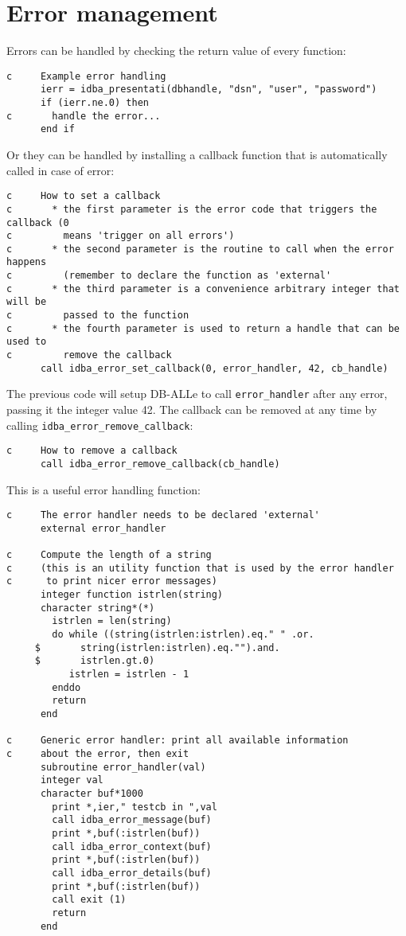\documentclass[draft,12pt,a4paper,twoside]{book}
\begin{document}
\section {Error management}

Errors can be handled by checking the return value of every function:

\begin{verbatim}
c     Example error handling
      ierr = idba_presentati(dbhandle, "dsn", "user", "password")
      if (ierr.ne.0) then
c       handle the error...
      end if
\end{verbatim}

Or they can be handled by installing a callback function that is automatically
called in case of error:

\begin{verbatim}
c     How to set a callback
c       * the first parameter is the error code that triggers the callback (0
c         means 'trigger on all errors')
c       * the second parameter is the routine to call when the error happens        
c         (remember to declare the function as 'external'
c       * the third parameter is a convenience arbitrary integer that will be
c         passed to the function
c       * the fourth parameter is used to return a handle that can be used to
c         remove the callback
      call idba_error_set_callback(0, error_handler, 42, cb_handle)
\end{verbatim}

The previous code will setup DB-ALLe to call {\tt error\_handler} after any error,
passing it the integer value 42.  The callback can be removed at any time by
calling {\tt idba\_error\_remove\_callback}:
 
\begin{verbatim}
c     How to remove a callback
      call idba_error_remove_callback(cb_handle)
\end{verbatim}

This is a useful error handling function:

\begin{verbatim}
c     The error handler needs to be declared 'external'
      external error_handler

c     Compute the length of a string
c     (this is an utility function that is used by the error handler
c      to print nicer error messages)
      integer function istrlen(string)
      character string*(*)
        istrlen = len(string)
        do while ((string(istrlen:istrlen).eq." " .or.
     $       string(istrlen:istrlen).eq."").and.
     $       istrlen.gt.0)
           istrlen = istrlen - 1
        enddo
        return
      end

c     Generic error handler: print all available information
c     about the error, then exit
      subroutine error_handler(val)
      integer val
      character buf*1000
        print *,ier," testcb in ",val
        call idba_error_message(buf)
        print *,buf(:istrlen(buf))
        call idba_error_context(buf)
        print *,buf(:istrlen(buf))
        call idba_error_details(buf)
        print *,buf(:istrlen(buf))
        call exit (1)
        return
      end
\end{verbatim}
\end{document}
